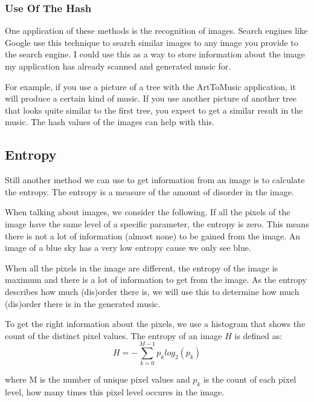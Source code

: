 \documentclass[12pt]{article}
\begin{document}
\subsubsection{Use Of The Hash}
One application of these methods is the recognition of images. Search engines like Google use this technique to search similar images to any image you provide to the search engine. I could use this as a way to store information about the image my application has already scanned and generated music for.
\newline

For example, if you use a picture of a tree with the ArtToMusic application, it will produce a certain kind of music. If you use another picture of another tree that looks quite similar to the first tree, you expect to get a similar result in the music. The hash values of the images can help with this. 

\subsection{Entropy}

Still another method we can use to get information from an image is to calculate the entropy.
The entropy is a measure of the amount of disorder in the image.
\newline

When talking about images, we consider the following. If all the pixels of the image have the same level of a specific parameter, the entropy is zero. This means there is not a lot of information (almost none) to be gained from the image. An image of a blue sky has a very low entropy cause we only see blue. 
\newpage

When all the pixels in the image are different, the entropy of the image is maximum and there is a lot of information to get from the image. As the entropy describes how much (dis)order there is, we will use this to determine how much (dis)order there is in the generated music.
\newline

To get the right information about the pixels, we use a histogram that shows the count of the distinct pixel values. The entropy of an image $H$ is defined as:
\begin{equation}
H = - \sum_{k=0}^{M-1} p_k log_2 (p_k)
\end{equation}

where M is the number of unique pixel values and $p_k$ is the count of each pixel level, how many times this pixel level occures in the image.
\newline
\end{document}
